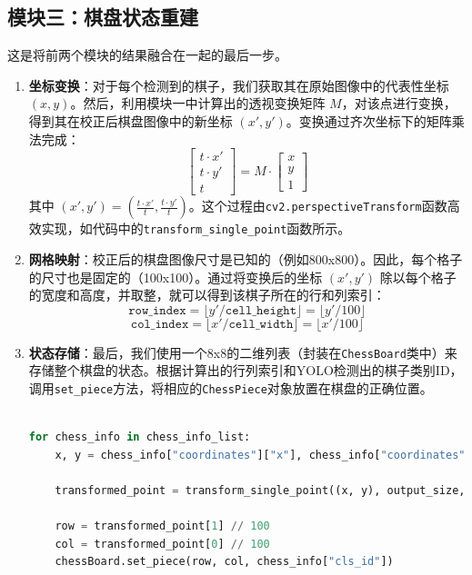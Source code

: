 \documentclass[12pt, a4paper]{article}
\begin{document}
\subsection{模块三：棋盘状态重建}
这是将前两个模块的结果融合在一起的最后一步。
\begin{enumerate}
    \item \textbf{坐标变换}：对于每个检测到的棋子，我们获取其在原始图像中的代表性坐标 $(x, y)$。然后，利用模块一中计算出的透视变换矩阵 $M$，对该点进行变换，得到其在校正后棋盘图像中的新坐标 $(x', y')$。变换通过齐次坐标下的矩阵乘法完成：
    \[
    \begin{bmatrix} t \cdot x' \\ t \cdot y' \\ t \end{bmatrix} = M \cdot \begin{bmatrix} x \\ y \\ 1 \end{bmatrix}
    \]
    其中 $(x', y') = (\frac{t \cdot x'}{t}, \frac{t \cdot y'}{t})$。这个过程由\texttt{cv2.perspectiveTransform}函数高效实现，如代码中的\texttt{transform\_single\_point}函数所示。
    
    \item \textbf{网格映射}：校正后的棋盘图像尺寸是已知的（例如800x800）。因此，每个格子的尺寸也是固定的（100x100）。通过将变换后的坐标 $(x', y')$ 除以每个格子的宽度和高度，并取整，就可以得到该棋子所在的行和列索引：
    \[
    \texttt{row\_index} = \lfloor y' / \texttt{cell\_height} \rfloor = \lfloor y' / 100 \rfloor
    \]
    \[
    \texttt{col\_index} = \lfloor x' / \texttt{cell\_width} \rfloor = \lfloor x' / 100 \rfloor
    \]
    
    \item \textbf{状态存储}：最后，我们使用一个8x8的二维列表（封装在\texttt{ChessBoard}类中）来存储整个棋盘的状态。根据计算出的行列索引和YOLO检测出的棋子类别ID，调用\texttt{set\_piece}方法，将相应的\texttt{ChessPiece}对象放置在棋盘的正确位置。
    \begin{lstlisting}[language=python, caption={坐标变换与网格映射}]

for chess_info in chess_info_list:
    x, y = chess_info["coordinates"]["x"], chess_info["coordinates"]["y"]
   
    transformed_point = transform_single_point((x, y), output_size, M)
   
    row = transformed_point[1] // 100
    col = transformed_point[0] // 100
    chessBoard.set_piece(row, col, chess_info["cls_id"])
    \end{lstlisting}
\end{enumerate}
\end{document}
